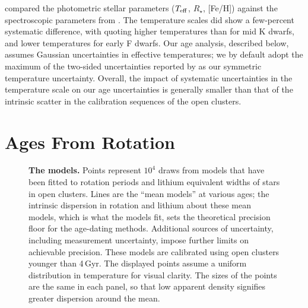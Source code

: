 \documentclass[11pt,twocolumn,tighten]{aastex63}
\begin{document}
\citet{David_2021} compared the photometric
 stellar parameters ($T_{\rm eff}$,
$R_\star$, [Fe/H]) against the spectroscopic parameters from
\citet{Fulton_2018}.  The temperature scales did show a few-percent
systematic difference, with  quoting higher
temperatures than  for mid K dwarfs,
and lower temperatures for early F dwarfs.  Our age analysis,
described below, assumes Gaussian uncertainties in effective
temperatures; we by default adopt the maximum of the two-sided
uncertainties reported by  as our
symmetric temperature uncertainty.  Overall, the impact of systematic
uncertainties in the temperature scale on our age uncertainties is
generally smaller than that of the intrinsic scatter in the
calibration sequences of the open clusters.





\section{Ages From Rotation}
\label{sec:rotage}

\begin{figure*}[!t]
	\begin{center}
		\leavevmode
	\end{center}
	\vspace{-0.6cm}
	\caption{
		{\bf The models.}
		Points represent $10^4$ draws from models
		that have been fitted to rotation periods
		\citep{Bouma_2023} and lithium equivalent widths
		\citep[EWs;][]{Jeffries_2023} of stars in open clusters.  Lines
		are the ``mean models'' at various ages; the intrinsic
		dispersion in rotation and lithium about these mean models, which
		is what the models fit, sets the theoretical precision floor for
		the age-dating methods.    Additional sources of uncertainty,
		including measurement uncertainty, impose further limits on
		achievable precision.  These models are calibrated using open
		clusters younger than 4\,Gyr.  The displayed points assume a
		uniform distribution in temperature for visual clarity.  The sizes
		of the points are the same in each panel, so that low apparent
		density signifies greater dispersion around the mean.
		\label{fig:models}
	}
\end{figure*}
\end{document}
